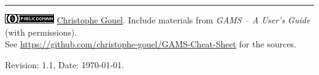 \documentclass[10pt,landscape,a4paper]{article}
\begin{document}
\begin{multicols}{2}
\vspace{0.5cm}
\rule{3cm}{0.5pt}

\href{http://creativecommons.org/publicdomain/zero/1.0/}{\includegraphics[height=1.75ex]{CC0-small.png}}
\href{http://www.christophegouel.com}{Christophe Gouel}. Include materials from \emph{GAMS -- A User's Guide} (with permissions). \\
See \url{https://github.com/christophe-gouel/GAMS-Cheat-Sheet} for the sources.

Revision: 1.1, Date: \today{}.

\end{multicols}
\end{document}
